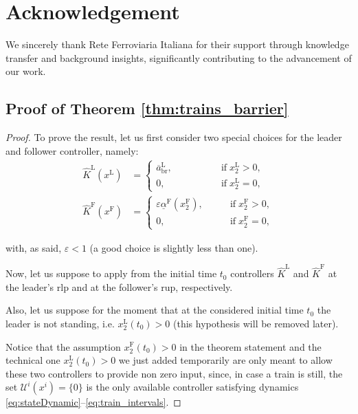 \documentclass[letterpaper, 10 pt, conference]{ieeeconf}
\theoremstyle{definition}
\theoremstyle{nopoint}
\newcounter{Theorem}
\begin{document}
\section*{Acknowledgement}
We sincerely thank Rete Ferroviaria Italiana for their support through knowledge transfer and background insights, significantly contributing to the advancement of our work.

\appendix

\subsection{Proof of Theorem \ref{thm:trains_barrier}}
\label{appendix:proofTheorem}

\begin{proof}
	To prove the result, let us first consider two special choices for the leader and follower controller, namely: 
\begin{align*}
	\hat{K}^\mathrm{L}(x^\mathrm{L}) &= 
	\begin{cases}
		\overline{a}^\mathrm{L}_{\mathrm{br}}, &\qquad \qquad \; \text{if} \; x_2^\mathrm{L} > 0, \\
		0, &\qquad \qquad \; \text{if} \; x_2^\mathrm{L} = 0,
	\end{cases} \\
	\hat{K}^\mathrm{F}(x^\mathrm{F}) &= 
	\begin{cases}
		\varepsilon \underline{\alpha}^\mathrm{F}(x_2^\mathrm{F}), &\qquad \text{if} \; x_2^\mathrm{F} > 0, \\
		0, &\qquad \text{if} \; x_2^\mathrm{F} = 0,
	\end{cases}
\end{align*}

	with, as said, $\varepsilon<1$ (a good choice is slightly less than one). 
	
	
	
	
	Now, let us suppose to apply from the initial time $t_0$ controllers $\hat{K}^\mathrm{L}$  and  $\hat{K}^\mathrm{F}$ at the leader's \gls{rlp} and at the follower's \gls{rup}, respectively. 
	
	
	Also, let us suppose for the moment that at the considered initial time $t_0$ the leader is not standing, i.e. $x_2^\mathrm{L}(t_0)>0$ (this hypothesis will be removed later).
	
	Notice that the assumption $x_2^\mathrm{F}(t_0)>0$ in the theorem statement  and the technical one $x_2^\mathrm{L}(t_0)>0$ we just added temporarily are only meant to allow these two controllers to provide non zero input, since, in case a train is still, the set $\mathcal{U}^i (x^i) = \{0\}$ is the only available controller satisfying dynamics  \eqref{eq:stateDynamic}–\eqref{eq:train_intervals}.
	

\end{proof}
\end{document}
